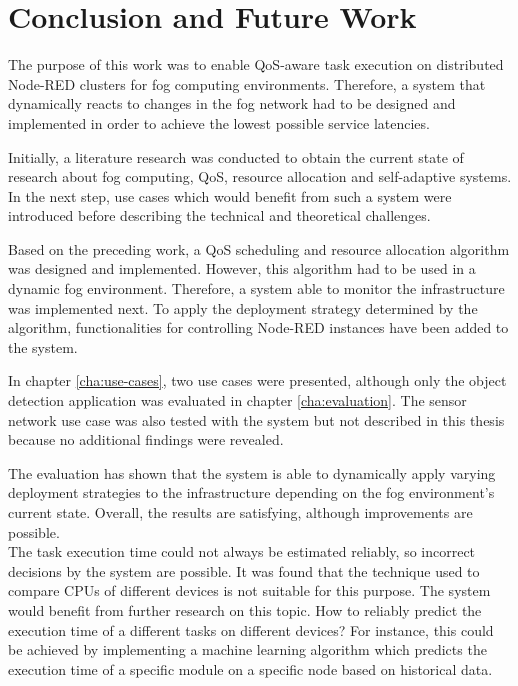 \chapter{Conclusion and Future Work}

The purpose of this work was to enable QoS-aware task execution on distributed Node-RED clusters for fog computing environments.
Therefore, a system that dynamically reacts to changes in the fog network had to be designed and implemented in order to achieve the lowest possible service latencies.

Initially, a literature research was conducted to obtain the current state of research about fog computing, QoS, resource allocation and self-adaptive systems.
In the next step, use cases which would benefit from such a system were introduced before describing the technical and theoretical challenges.

Based on the preceding work, a QoS scheduling and resource allocation algorithm was designed and implemented.
However, this algorithm had to be used in a dynamic fog environment.
Therefore, a system able to monitor the infrastructure was implemented next.
To apply the deployment strategy determined by the algorithm, functionalities for controlling Node-RED instances have been added to the system.

In chapter \ref{cha:use-cases}, two use cases were presented, although only the object detection application was evaluated in chapter \ref{cha:evaluation}.
The sensor network use case was also tested with the system but not described in this thesis because no additional findings were revealed.

The evaluation has shown that the system is able to dynamically apply varying deployment strategies to the infrastructure depending on the fog environment's current state.
Overall, the results are satisfying, although improvements are possible.\\


The task execution time could not always be estimated reliably, so incorrect decisions by the system are possible.
It was found that the technique used to compare CPUs of different devices is not suitable for this purpose.
The system would benefit from further research on this topic.
How to reliably predict the execution time of a different tasks on different devices?
For instance, this could be achieved by implementing a machine learning algorithm which predicts the execution time of a specific module on a specific node based on historical data.

